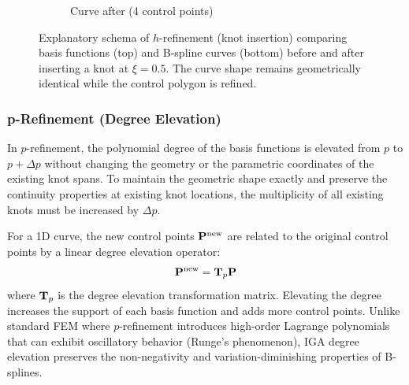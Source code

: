 \begin{figure}[htbp]
\begin{subfigure}[b]{0.48\textwidth}
        \caption{Curve after (4 control points)}
        \label{fig:href_curve_after}
    \end{subfigure}
    \caption{Explanatory schema of $h$-refinement (knot insertion) comparing basis functions (top) and B-spline curves (bottom) before and after inserting a knot at $\xi = 0.5$. The curve shape remains geometrically identical while the control polygon is refined.}
    \label{fig:hrefinement_basis}
\end{figure}

\subsubsection{p-Refinement (Degree Elevation)}
In $p$-refinement, the polynomial degree of the basis functions is elevated from $p$ to $p + \Delta p$ without changing the geometry or the parametric coordinates of the existing knot spans. To maintain the geometric shape exactly and preserve the continuity properties at existing knot locations, the multiplicity of all existing knots must be increased by $\Delta p$.

For a 1D curve, the new control points $\mathbf{P}^{\text{new}}$ are related to the original control points by a linear degree elevation operator:
\begin{equation}
    \mathbf{P}^{\text{new}} = \mathbf{T}_p \mathbf{P}
\end{equation}
where $\mathbf{T}_p$ is the degree elevation transformation matrix. Elevating the degree increases the support of each basis function and adds more control points. Unlike standard FEM where $p$-refinement introduces high-order Lagrange polynomials that can exhibit oscillatory behavior (Runge's phenomenon), IGA degree elevation preserves the non-negativity and variation-diminishing properties of B-splines.

